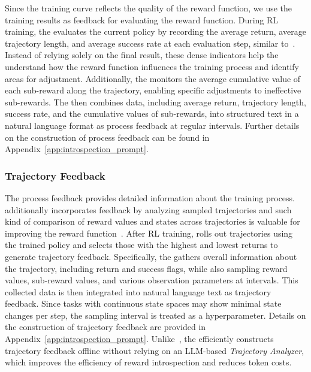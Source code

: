 \documentclass{article}
\theoremstyle{plain}
\theoremstyle{definition}
\theoremstyle{remark}
\begin{document}
Since the training curve reflects the quality of the reward function, we use the training results as feedback for evaluating the reward function. During RL training, the \critic evaluates the current policy by recording the average return, average trajectory length, and average success rate at each evaluation step, similar to~\cite{Eureka}. Instead of relying solely on the final result, these dense indicators help the \designer understand how the reward function influences the training process and identify areas for adjustment. Additionally, the \critic monitors the average cumulative value of each sub-reward along the trajectory, enabling specific adjustments to ineffective sub-rewards. The \critic then combines data, including average return, trajectory length, success rate, and the cumulative values of sub-rewards, into structured text in a natural language format as process feedback at regular intervals. Further details on the construction of process feedback can be found in Appendix~\ref{app:introspection_prompt}.


\subsubsection{Trajectory Feedback}

The process feedback provides detailed information about the training process. \ourmethod additionally incorporates feedback by analyzing sampled trajectories and such kind of comparison of reward values and states across trajectories is valuable for improving the reward function~\cite{li2024auto}. After RL training, \ourmethod rolls out trajectories using the trained policy and selects those with the highest and lowest returns to generate trajectory feedback. Specifically, the \critic gathers overall information about the trajectory, including return and success flags, while also sampling reward values, sub-reward values, and various observation parameters at intervals. This collected data is then integrated into natural language text as trajectory feedback. Since tasks with continuous state spaces may show minimal state changes per step, the sampling interval is treated as a hyperparameter. Details on the construction of trajectory feedback are provided in Appendix~\ref{app:introspection_prompt}. Unlike~\cite{li2024auto}, the \critic efficiently constructs trajectory feedback offline without relying on an LLM-based \textit{Trajectory Analyzer}, which improves the efficiency of reward introspection and reduces token costs.
\end{document}
